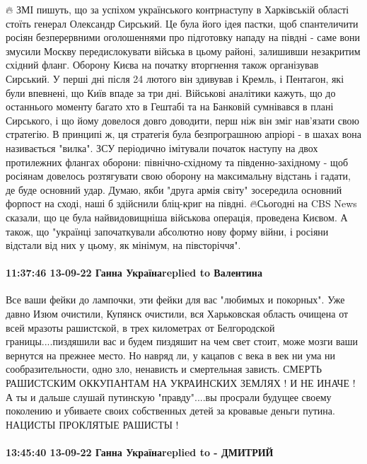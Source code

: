 🔥 ЗМІ пишуть, що за успіхом українського контрнаступу в Харківській області стоїть генерал Олександр Сирський.
Це була його ідея пастки, щоб спантеличити росіян безперервними оголошеннями про підготовку нападу на півдні - саме вони змусили Москву передислокувати війська в цьому районі, залишивши незакритим східний фланг.
Оборону Києва на початку вторгнення також організував Сирський. У перші дні після 24 лютого він здивував і Кремль, і Пентагон, які були впевнені, що Київ впаде за три дні.
Військові аналітики кажуть, що до останнього моменту багато хто в Гештабі та на Банковій сумнівався в плані Сирського, і що йому довелося довго доводити, перш ніж він зміг нав'язати свою стратегію.
В принципі ж, ця стратегія була безпрограшною апріорі - в шахах вона називається "вилка". ЗСУ періодично імітували початок наступу на двох протилежних флангах оборони: північно-східному та південно-західному - щоб росіянам довелось розтягувати свою оборону на максимальну відстань і гадати, де буде основний удар. Думаю, якби "друга армія світу" зосередила основний форпост на сході, наші б здійснили бліц-криг на півдні.
🔥Сьогодні на CBS News сказали, що це була найвидовищніша військова операція, проведена Києвом. А також, що "українці започаткували абсолютно нову форму війни, і росіяни відстали від них у цьому, як мінімум, на півсторіччя".

\paragraph{11:37:46 13-09-22 Ганна Українаreplied to Валентина}

Все ваши фейки до лампочки, эти фейки для вас "любимых и покорных". Уже давно
Изюм очистили, Купянск очистили, вся Харьковская область очищена от всей
мразоты рашистской, в трех километрах от Белгородской границы....пиздяшили вас
и будем пиздяшит на чем свет стоит, може мозги ваши вернутся на прежнее место.
Но навряд ли, у кацапов с века в век ни ума ни сообразительности, одно зло,
ненависть и смертельная зависть. СМЕРТЬ РАШИСТСКИМ ОККУПАНТАМ НА УКРАИНСКИХ
ЗЕМЛЯХ ! И НЕ ИНАЧЕ ! А ты и дальше слушай путинскую "правду"....вы просрали
будущее своему поколению и убиваете своих собственных детей за кровавые деньги
путина. НАЦИСТЫ ПРОКЛЯТЫЕ РАШИСТЫ !

\paragraph{13:45:40 13-09-22 Ганна Українаreplied to - ДМИТРИЙ}

